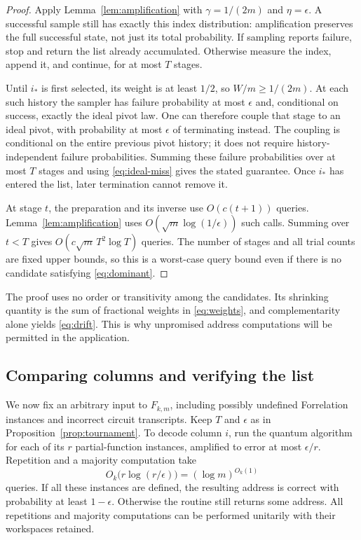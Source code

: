 \begin{proof}
Apply Lemma~\ref{lem:amplification} with $\gamma=1/(2m)$ and
$\eta=\epsilon$. A successful sample still has exactly this index
distribution: amplification preserves the full successful state, not
just its total probability. If sampling reports failure, stop and
return the list already accumulated. Otherwise measure the index,
append it, and continue, for at most $T$ stages.

Until $i_\ast$ is first selected, its weight is at least $1/2$, so
$W/m\ge1/(2m)$. At each such history the sampler has failure probability
at most $\epsilon$ and, conditional on success, exactly the ideal pivot
law. One can therefore couple that stage to an ideal pivot, with
probability at most $\epsilon$ of terminating instead. The coupling
is conditional on the entire previous pivot history; it does not
require history-independent failure probabilities. Summing these
failure probabilities over at most $T$ stages and using
\eqref{eq:ideal-miss} gives the stated guarantee. Once $i_\ast$ has
entered the list, later termination cannot remove it.

At stage $t$, the preparation and its inverse use $O(c(t+1))$ queries.
Lemma~\ref{lem:amplification} uses $O(\sqrt m\log(1/\epsilon))$
such calls. Summing over $t<T$ gives
$O(c\sqrt m\,T^2\log T)$ queries. The number of stages and all trial
counts are fixed upper bounds, so this is a worst-case query bound
even if there is no candidate satisfying \eqref{eq:dominant}.
\end{proof}

The proof uses no order or transitivity among the candidates. Its
shrinking quantity is the sum of fractional weights in
\eqref{eq:weights}, and complementarity alone yields
\eqref{eq:drift}. This is why unpromised address computations will be
permitted in the application.

\subsection{Comparing columns and verifying the list}

We now fix an arbitrary input to $F_{k,m}$, including possibly undefined
Forrelation instances and incorrect circuit transcripts. Keep $T$ and
$\epsilon$ as in Proposition~\ref{prop:tournament}. To decode column
$i$, run the quantum algorithm for each of its $r$ partial-function
instances, amplified to error at most $\epsilon/r$. Repetition and a
majority computation take
\[
 O_k\bigl(r\log(r/\epsilon)\bigr)=(\log m)^{O_k(1)}
\]
queries. If all these instances are defined, the resulting address is
correct with probability at least $1-\epsilon$. Otherwise the routine
still returns some address. All repetitions and majority computations
can be performed unitarily with their workspaces retained.

